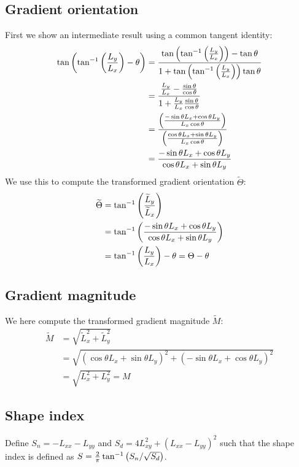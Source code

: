 \documentclass[thesis.tex]{subfiles}
\begin{document}
\subsection{Gradient orientation} \label{apx:rotation_go}
%
First we show an intermediate result using a common tangent identity:
%
\begin{align*}
\tan \left( \tan^{-1} \left( \frac{L_y}{L_x} \right) - \theta \right)
&= \frac{\tan \left( \tan^{-1} \left( \frac{L_y}{L_x} \right) \right) - \tan \theta}{1 + \tan \left( \tan^{-1} \left( \frac{L_y}{L_x} \right) \right) \tan \theta} \\
&= \frac{\frac{L_y}{L_x} - \frac{\sin \theta}{\cos \theta}}{1 + \frac{L_y}{L_x} \frac{\sin \theta}{\cos \theta}} \\
&= \frac{\left(\frac{-\sin \theta L_x + \cos \theta L_y}{L_x \cos \theta}\right)}{\left(\frac{\cos \theta L_x + \sin \theta L_y}{L_x \cos \theta}\right)} \\
&= \frac{-\sin \theta L_x + \cos \theta L_y}{\cos \theta L_x + \sin \theta L_y}
\end{align*}
%
We use this to compute the transformed gradient orientation $\widetilde{\Theta}$:
%
\begin{align*}
\widetilde{\Theta} &= \tan^{-1} \left( \frac{\widetilde{L}_y}{\widetilde{L}_x} \right) \\
&= \tan^{-1} \left( \frac{-\sin \theta L_x + \cos \theta L_y}{\cos \theta L_x + \sin \theta L_y} \right) \\
&= \tan^{-1} \left( \frac{L_y}{L_x} \right) - \theta = \Theta - \theta
\end{align*}
%
\subsection{Gradient magnitude} \label{apx:rotation_m}
We here compute the transformed gradient magnitude $\widetilde{M}$:
%
\begin{align*}
\widetilde{M} &= \sqrt{\widetilde{L}_x^2 + \widetilde{L}_y^2} \\
&= \sqrt{(\cos \theta L_x + \sin \theta L_y)^2 + (-\sin \theta L_x + \cos \theta L_y)^2} \\
&= \sqrt{L_x^2 + L_y^2} = M
\end{align*}
%
\subsection{Shape index} \label{apx:rotation_si}
%
Define $S_n = -L_{xx} - L_{yy}$ and $S_d = 4 L_{xy}^2 + (L_{xx} - L_{yy})^2$ such that the shape index is defined as $S = \frac{2}{\pi} \tan^{-1} \left( S_n/\sqrt{S_d} \right)$.
\end{document}
